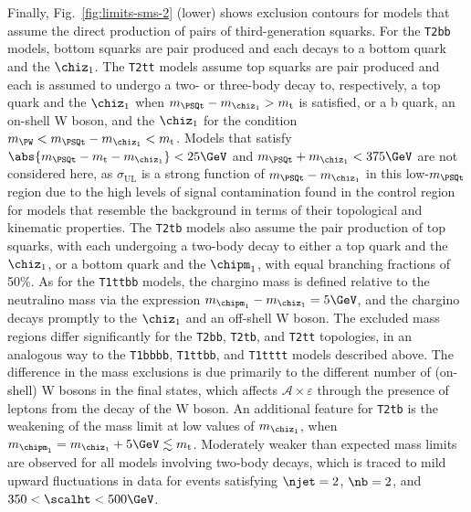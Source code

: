 Finally, Fig.~\ref{fig:limits-sms-2} (lower) shows exclusion contours
for models that assume the direct production of pairs of
third-generation squarks. For the \texttt{T2bb} models, bottom squarks
are pair produced and each decays to a bottom quark and the
$\chiz_1$. The \texttt{T2tt} models assume top squarks are pair
produced and each is assumed to undergo a two- or three-body decay to,
respectively, a top quark and the $\chiz_1$ when $m_{\PSQt} -
m_{\chiz_1} > m_\text{t}$ is satisfied, or a b quark, an on-shell W
boson, and the $\chiz_1$ for the condition $m_{\PW} < m_{\PSQt} -
m_{\chiz_1} < m_\text{t}$. Models that satisfy $\abs{m_{\PSQt} -
  m_\text{t} - m_{\chiz_1}} < 25\GeV$ and $m_{\PSQt} + m_{\chiz_1} <
375\GeV$ are not considered here, as $\sigma_\text{UL}$ is a strong
function of $m_{\PSQt} - m_{\chiz_1}$ in this low-$m_{\PSQt}$ region
due to the high levels of signal contamination found in the \mj
control region for models that resemble the \ttbar background in terms
of their topological and kinematic properties. The \texttt{T2tb}
models also assume the pair production of top squarks, with each
undergoing a two-body decay to either a top quark and the $\chiz_1$,
or a bottom quark and the $\chipm_1$, with equal branching fractions
of 50\%. As for the \texttt{T1ttbb} models, the chargino mass is
defined relative to the neutralino mass via the expression
$m_{\chipm_1} - m_{\chiz_1} = 5\GeV$, and the chargino decays promptly
to the $\chiz_1$ and an off-shell W boson. The excluded mass regions
differ significantly for the \texttt{T2bb}, \texttt{T2tb}, and
\texttt{T2tt} topologies, in an analogous way to the \texttt{T1bbbb},
\texttt{T1ttbb}, and \texttt{T1tttt} models described above. The
difference in the mass exclusions is due primarily to the different
number of (on-shell) W bosons in the final states, which affects
$\mathcal{A} \times \varepsilon$ through the presence of leptons from
the decay of the W boson. An additional feature for \texttt{T2tb} is
the weakening of the mass limit at low values of $m_{\chiz_1}$, when
$m_{\chipm_1} = m_{\chiz_1} + 5\GeV \lesssim m_\text{t}$. Moderately
weaker than expected mass limits are observed for all models involving
two-body decays, which is traced to mild upward fluctuations in data
for events satisfying $\njet = 2$, $\nb = 2$, and $350 < \scalht <
500\GeV$.

